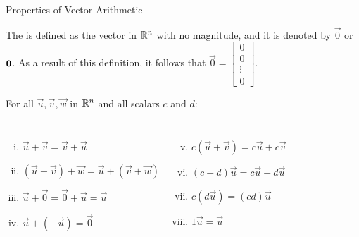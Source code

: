 \documentclass[xcoler=dvipsnames, aspectratio=169]{beamer}
\begin{document}
\begin{frame}{Properties of Vector Arithmetic}
    \small
    \begin{tcolorbox}
        The  is defined as the vector in $\mathbb{R}^n$ with no magnitude, and it is denoted by $\vec{0}$ or $\vecOld{0}$. As a result of this definition, it follows that $\displaystyle \vec{0} = \begin{bmatrix} 0 \\ 0 \\ \vdots \\ 0 \end{bmatrix}$.
    \end{tcolorbox}

  For all $\vec{u}, \vec{v}, \vec{w}$ in $\mathbb{R}^n$ and all scalars $c$ and $d$:

  \begin{columns}[T]
    \begin{enumerate}[(i)]
      \item $\vec{u} + \vec{v} = \vec{v} + \vec{u}$
      \item $(\vec{u} + \vec{v}) + \vec{w} = \vec{u} + (\vec{v} + \vec{w})$
      \item $\vec{u} + \vec{0} = \vec{0} + \vec{u} = \vec{u}$
      \item $\vec{u} + (-\vec{u}) = \vec{0}$
      \end{enumerate}

      \begin{enumerate}[(i)]
    \setcounter{enumi}{4}
    \item $c(\vec{u}+\vec{v}) = c\vec{u}+c\vec{v}$
    \item $(c+d) \vec{u} = c\vec{u} + d \vec{u}$
    \item $c(d \vec{u}) = (cd) \vec{u}$
    \item $1 \vec{u} = \vec{u}$
      \end{enumerate}
  \end{columns}

  \end{frame}
\end{document}
